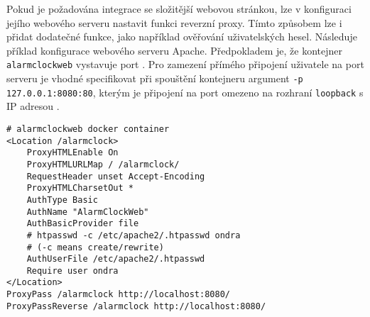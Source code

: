 Pokud je požadována integrace se složitější webovou stránkou, lze v konfiguraci
jejího webového serveru nastavit funkci reverzní proxy. Tímto způsobem lze
i přidat dodatečné funkce, jako například ověřování uživatelských hesel.
Následuje příklad konfigurace webového serveru Apache.
Předpokladem je, že kontejner \texttt{alarmclockweb} vystavuje port
. Pro zamezení přímého připojení uživatele na port 
serveru je vhodné specifikovat při spouštění kontejneru argument
\texttt{-p 127.0.0.1:8080:80}, kterým je připojení na port  omezeno
na rozhraní \texttt{loopback} s IP adresou .
\begin{lstlisting}[language=hashcomment,style=numbers]
# alarmclockweb docker container
<Location /alarmclock>
    ProxyHTMLEnable On
    ProxyHTMLURLMap / /alarmclock/
    RequestHeader unset Accept-Encoding
    ProxyHTMLCharsetOut *
    AuthType Basic
    AuthName "AlarmClockWeb"
    AuthBasicProvider file
    # htpasswd -c /etc/apache2/.htpasswd ondra
    # (-c means create/rewrite)
    AuthUserFile /etc/apache2/.htpasswd
    Require user ondra
</Location>
ProxyPass /alarmclock http://localhost:8080/
ProxyPassReverse /alarmclock http://localhost:8080/
\end{lstlisting}
